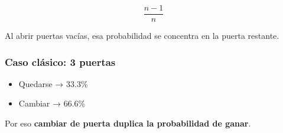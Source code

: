 \documentclass[
  spanish,
  letterpaper,
  DIV=11,
  numbers=noendperiod,
  oneside]{scrreprt}
\providecommand{\tightlist}{%
  \setlength{\itemsep}{0pt}\setlength{\parskip}{0pt}}
\begin{document}
\[
\frac{n-1}{n}
\]

Al abrir puertas vacías, esa probabilidad se concentra en la puerta
restante.

\subsection{Caso clásico: 3 puertas}\label{caso-cluxe1sico-3-puertas}

\begin{itemize}
\tightlist
\item
  Quedarse → 33.3\%
\item
  Cambiar → 66.6\%
\end{itemize}

Por eso \textbf{cambiar de puerta duplica la probabilidad de ganar}.

\chapter{}\label{section-3}

\chapter{}\label{section-4}

\chapter{}\label{section-5}


\chapter{}\label{section-6}
\end{document}
